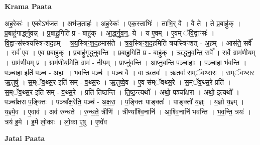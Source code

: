 \documentclass[17pt]{extarticle}
\begin{document}
\textbf{Krama Paata} \newline

अह॒रेकः॑ । एकोऽभ॑जत । अभ॑ज॒ताहः॑ । अह॒रेकः॑ । एक॒स्ताभिः॑ । ताभि॒र् वै । वै ते । ते प्र॒बाहु॑क् । प्र॒बाहु॑गार्द्ध्नुवन्न् । प्र॒बाहु॒गिति॑ प्र - बाहु॑क् । आ॒र्द्ध्नु॒व॒न्॒. ये । य ए॒वम् । ए॒वम् ॅवि॒द्वाꣳसः॑ । वि॒द्वाꣳस॑स्त्रयस्त्रिꣳशद॒हम् । त्र॒य॒स्त्रिꣳ॒॒श॒द॒हमास॑ते । त्र॒य॒स्त्रिꣳ॒॒श॒द॒हमिति॑ त्रयस्त्रिꣳशत् - अ॒हम् । आस॑ते॒ सर्वे᳚ । सर्व॑ ए॒व । ए॒व प्र॒बाहु॑क् । प्र॒बाहु॑गृद्ध्नुवन्ति । प्र॒बाहु॒गिति॑ प्र - बाहु॑क् । ऋ॒द्ध्नु॒व॒न्ति॒ सर्वे᳚ । सर्वे॒ ग्राम॑णीयम् । ग्राम॑णीय॒म् प्र । ग्राम॑णीय॒मिति॒ ग्राम॑ - नी॒य॒म् । प्राप्नु॑वन्ति । आ॒प्नु॒व॒न्ति॒ प॒ञ्चा॒हाः । प॒ञ्चा॒हा भ॑वन्ति । प॒ञ्चा॒हा इति॑ पञ्च - अ॒हाः । भ॒व॒न्ति॒ पञ्च॑ । पञ्च॒ वै । वा ऋ॒तवः॑ । ऋ॒तवः॑ सम्ॅवथ्स॒रः । स॒म्ॅव॒थ्स॒र ऋ॒तुषु॑ । स॒म्ॅव॒थ्स॒र इति॑ सम् - व॒थ्स॒रः । ऋ॒तुष्वे॒व । ए॒व स॑म्ॅवथ्स॒रे । स॒म्ॅव॒थ्स॒रे प्रति॑ । स॒म्ॅव॒थ्स॒र इति॑ सम् - व॒थ्स॒रे । प्रति॑ तिष्ठन्ति । ति॒ष्ठ॒न्त्यथो᳚ । अथो॒ पञ्चा᳚क्षरा । अथो॒ इत्यथो᳚ । पञ्चा᳚क्षरा प॒ङ्‍क्तिः । पञ्चा᳚क्ष॒रेति॒ पञ्च॑ - अ॒क्ष॒रा॒ । प॒ङ्‍क्तिः पाङ्‍क्तः॑ । पाङ्‍क्तो॑ य॒ज्ञ्ः । य॒ज्ञो य॒ज्ञ्म् । य॒ज्ञ्मे॒व । ए॒वाव॑ । अव॑ रुन्धते । रु॒न्ध॒ते॒ त्रीणि॑ । त्रीण्या᳚श्वि॒नानि॑ । आ॒श्वि॒नानि॑ भवन्ति । भ॒व॒न्ति॒ त्रयः॑ । त्रय॑ इ॒मे । इ॒मे लो॒काः । लो॒का ए॒षु । ए॒ष्वे॑व \newline

\textbf{Jatai Paata} \newline
\end{document}
